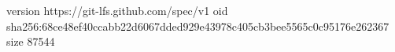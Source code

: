 version https://git-lfs.github.com/spec/v1
oid sha256:68ce48ef40ccabb22d6067dded929e43978c405cb3bee5565c0c95176e262367
size 87544
